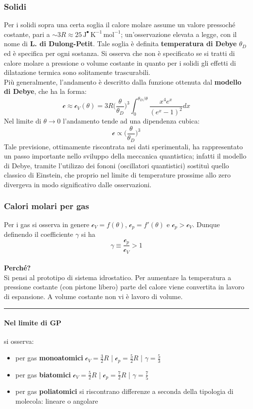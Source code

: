 \documentclass[10pt, oneside]{book}
\newcommand{\kelvin}[1]{\, \mathrm{K^{#1}}}
\newcommand{\joule}[1]{\, \mathrm{J^{#1}}}
\newcommand{\mols}[1]{\, \mathrm{mol^{#1}}}
\newcommand{\infobox}[2]{\vspace{0.5cm}~\\ \textbf{#1} \hrulefill \vspace{0.2cm}\\#2 {}\,\\\hrule \vspace{0.5cm}}
\newcommand{\ds}{\displaystyle}
\newcommand{\molhtv}{\mathcal{c}_V }
\newcommand{\molhtp}{\mathcal{c}_p }
\begin{document}
\subsubsection{Solidi}
Per i solidi sopra una certa soglia il calore molare assume un valore pressoché costante, pari a $\ds \sim 3R \approx 25 \joule{•} \kelvin{-1} \mols{-1}$; un'osservazione elevata a legge, con il nome di \textbf{L. di Dulong-Petit}. Tale soglia è definita \textbf{temperatura di Debye} $\theta_D$ ed è specifica per ogni sostanza. Si osserva che non è specificato se si tratti di calore molare a pressione o volume costante in quanto per i solidi gli effetti di dilatazione termica sono solitamente trascurabili.\\
Più generalmente, l'andamento è descritto dalla funzione ottenuta dal \textbf{modello di Debye}, che ha la forma:
\[\mathcal{c} \approx \mathcal{c}_V(\theta)=3R\big(\frac{\theta}{\theta_D}\big)^3\int_{0}^{\theta_D/\theta}\frac{x^4 e^x}{(e^x-1)^2}dx\]
Nel limite di $\theta \rightarrow 0$ l'andamento tende ad una dipendenza cubica:
\[\mathcal{c} \propto \bigg(\frac{\theta}{\theta_D}\bigg)^3\]
Tale previsione, ottimamente riscontrata nei dati sperimentali, ha rappresentato un passo importante nello sviluppo della meccanica quantistica; infatti il modello di Debye, tramite l'utilizzo dei fononi (oscillatori quantistici) sostituì quello classico di Einstein, che proprio nel limite di temperature prossime allo zero divergeva in modo significativo dalle osservazioni.

\subsubsection{Calori molari per gas}
Per i gas si osserva in genere $\ds  \molhtv = f(\theta)$, $\molhtp = f'(\theta)$ e $\molhtp > \molhtv$. Dunque definendo il coefficiente $\gamma$ si ha
\[\gamma \equiv \frac{\molhtp}{\molhtv} > 1\]
\infobox{Perché?}{Si pensi al prototipo di sistema idrostatico. Per aumentare la temperatura a pressione costante (con pistone libero) parte del calore viene convertita in lavoro di espansione. A volume costante non vi è lavoro di volume.}
\paragraph{Nel limite di GP} si osserva:
\begin{itemize}
\item per gas \textbf{monoatomici} \hfill $\displaystyle \mathcal{c}_V = \frac{3}{2}R$ \hfill \bigg| \hfill $\displaystyle \mathcal{c}_p = \frac{5}{2} R$ \hfill \bigg| \hfill $\displaystyle \gamma = \frac{5}{3}$
\item per gas \textbf{biatomici}
\hfill $\displaystyle \mathcal{c}_V = \frac{5}{2}R$ \hfill \bigg| \hfill $\displaystyle \mathcal{c}_p = \frac{7}{2} R$ \hfill \bigg| \hfill $\displaystyle \gamma = \frac{7}{5}$
\item per gas \textbf{poliatomici} si riscontrano differenze a seconda della tipologia di molecola: lineare o angolare
\end{itemize}
\end{document}
